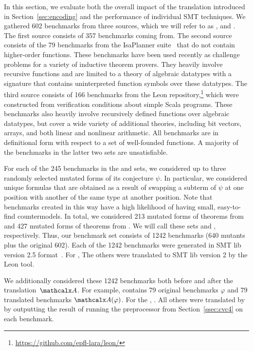 {
In this section, we evaluate both the overall impact of the translation
introduced in Section~\ref{sec:encoding} and the performance of individual SMT
techniques.
%
We gathered 602 benchmarks from three sources, which we will refer to as
\isanun, \isa and \leon. 
The first source consists of 357 benchmarks coming from.
The second source consists of the 79
benchmarks from the IsaPlanner
suite~\cite{DBLP:conf/itp/JohanssonDB10} that do not contain higher-order
functions. These benchmarks have been used recently as challenge problems for a
variety of inductive theorem provers. They heavily involve
recursive functions and are limited to a theory of algebraic datatypes
with a signature that contains uninterpreted function symbols over these datatypes. 
The third source consists of 166
benchmarks from the Leon repository,\footnote{%
\url{https://github.com/epfl-lara/leon/}} which were constructed from
verification conditions about simple Scala programs. These benchmarks also
heavily involve recursively defined functions over algebraic datatypes, 
but cover a wide variety of additional theories, including bit vectors, arrays, and
both linear and nonlinear arithmetic. All benchmarks are in definitional form
with respect to a set of well-founded functions.
A majority of the benchmarks in the latter two sets are unsatisfiable.
}

For each of the 245 benchmarks in the \isa and \leon sets, 
we considered up to three randomly selected
mutated forms of its conjecture $\psi$. In particular, we considered unique
formulas that are obtained as a result of swapping a subterm of $\psi$ at
one position with another of the same type at another position.
Note that benchmarks created in this way have a high likelihood of having
small, easy-to-find countermodels. In total, we considered 213 mutated forms of
theorems from \isa and 427 mutated forms of theorems from \leon. We will
call these sets \isam and \leonm, respectively.
Thus, our benchmark set consists of 1242 benchmarks (640 mutants plus the
original 602). 
Each of the 1242 benchmarks were generated in SMT lib version 2.5 format~\cite{smtlib25}. %
For \isanun, 
The others were translated to SMT lib version 2 by the Leon tool.

We additionally considered these 1242 benchmarks both before and after the translation~$\conv$.
For example, \isa contains 79 original benchmarks $\varphi$ and 79 translated
benchmarks $\conv(\varphi)$.
For the \isanun, .
All others were translated by \cvc 
by outputting the result of running the preprocessor from Section~\ref{ssec:cvc4} on each benchmark.

